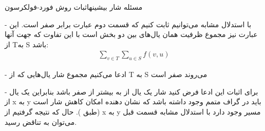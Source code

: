 \begin{itemframe}{مسئله شار بیشینه}{اثبات روش فورد-فولکرسون}
\item[-]
با استدلال مشابه می‌توانیم ثابت کنیم که قسمت دوم عبارت برابر صفر است. این عبارت نیز مجموع ظرفیت همان یال‌های بین دو بخش است با این تفاوت که جهت آنها از T‌به S باشد:
\begin{align*}
\sum_{v \in T} \sum_{u \in S} f(v, u)
\end{align*}
\item[-]
ادعا می‌کنیم مجموع شار یال‌هایی که از T به S می‌روند صفر است
\item[-]
برای اثبات این ادعا فرض کنید شار یک یال از
به
بیشتر از صفر باشد بنابراین یک یال از x به y باید در گراف متمم وجود داشته باشد که نشان دهنده امکان کاهش شار است (طبق ). حال که نتیجه گرفتیم از x به y مسیر وجود دارد با استدلال مشابه قسمت قبل می‌توان به تناقض رسید.
\end{itemframe}

